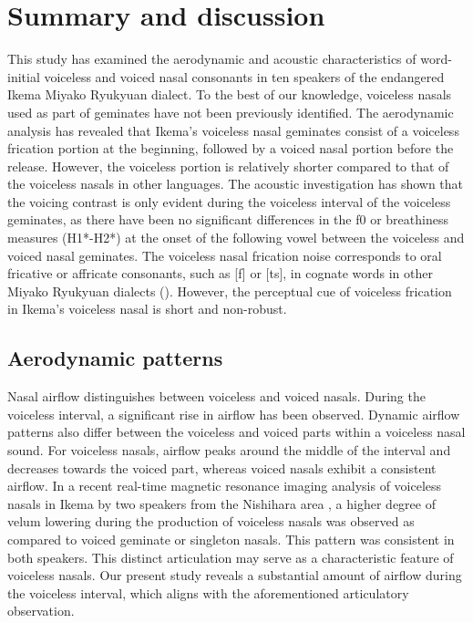 \documentclass[output=paper]{langscibook}
\begin{document}
\section{Summary and discussion}
\label{sec:shinohara:5}
This study has examined the aerodynamic and acoustic characteristics of word-initial voiceless and voiced nasal consonants in ten speakers of the endangered Ikema Miyako Ryukyuan dialect. To the best of our knowledge, voiceless nasals used as part of geminates have not been previously identified. The aerodynamic analysis has revealed that Ikema’s voiceless nasal geminates consist of a voiceless frication portion at the beginning, followed by a voiced nasal portion before the release. However, the voiceless portion is relatively shorter compared to that of the voiceless nasals in other languages. The acoustic investigation has shown that the voicing contrast is only evident during the voiceless interval of the voiceless geminates, as there have been no significant differences in the f0 or breathiness measures (H1*-H2*) at the onset of the following vowel between the voiceless and voiced nasal geminates. The voiceless nasal frication noise corresponds to oral fricative or affricate consonants, such as [f] or [ts], in cognate words in other Miyako Ryukyuan dialects (). However, the perceptual cue of voiceless frication in Ikema’s voiceless nasal is short and non-robust. 

\subsection{Aerodynamic patterns}
\label{sec:shinohara:5.1}
\begin{sloppypar}
Nasal airflow distinguishes between voiceless and voiced nasals. During the voiceless interval, a significant rise in airflow has been observed. Dynamic airflow patterns also differ between the voiceless and voiced parts within a voiceless nasal sound. For voiceless nasals, airflow peaks around the middle of the interval and decreases towards the voiced part, whereas voiced nasals exhibit a consistent airflow. In a recent real-time magnetic resonance imaging analysis of voiceless nasals in Ikema by two speakers from the Nishihara area \citep{FujimotoEtAl2023}, a higher degree of velum lowering during the production of voiceless nasals was observed as compared to voiced geminate or singleton nasals. This pattern was consistent in both speakers. This distinct articulation may serve as a characteristic feature of voiceless nasals. Our present study reveals a substantial amount of airflow during the voiceless interval, which aligns with the aforementioned articulatory observation.
\end{sloppypar}
\end{document}
